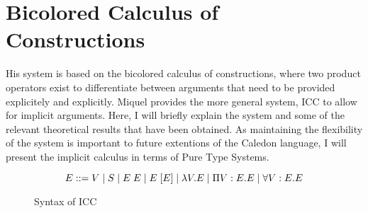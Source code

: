 \section{Bicolored Calculus of Constructions}

His system is based on the bicolored calculus of constructions, where two product operators exist to 
differentiate between arguments that need to be provided explicitely and explicitly.  
Miquel \citep{miquel2001implicit} provides the more general system, ICC to allow for implicit arguments.
Here, I will briefly explain the system and some of the relevant theoretical results that have been obtained.
As maintaining the flexibility of the system is important to future extentions of the Caledon language, 
I will present the implicit calculus in terms of Pure Type Systems.

\begin{figure}[h]
\[ 
E ::= V 
 \; | \; S 
 \; | \; E\;E 
 \; | \; E\;[E]
 \; | \; \lambda V . E 
 \; | \; \Pi V : E . E 
 \; | \; \forall V : E . E 
\]
\caption{Syntax of ICC}
\label{icc:syntax}
\end{figure}
